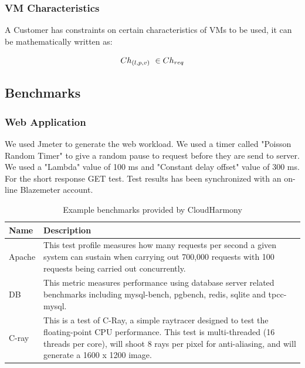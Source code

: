 \subsubsection{VM Characteristics}

A Customer has constraints on certain characteristics of VMs to be used, it can be mathematically written as:
          
\begin{equation} \label{eq:characteristics_constraint}
Ch_{(l,p,v)}\ \in Ch_{req}
\end{equation}



\subsection{Benchmarks}
\subsubsection{Web Application}
We used Jmeter to generate the web workload.
We used a timer called "Poisson Random Timer" to give a random pause to request before they are send to server. We used a "Lambda" value of 100 ms and "Constant delay offset" value of 300 ms. For the short response GET test.
Test results has been synchronized with an on-line Blazemeter account.


\begin{table}[!htbp]
\caption{Example benchmarks provided by CloudHarmony}
\label{table:Example_benchmarks}
\begin{center}
    \begin{tabularx}{\textwidth}{|l|X|}
    \hline
    Name & Description \\ \hline
    Apache & This test profile measures how many requests per second a given system can sustain when carrying out 700,000 requests with 100 requests being carried out concurrently. \\ \hline
    DB & This metric measures performance using database server related benchmarks including mysql-bench, pgbench, redis, sqlite and tpcc-mysql. \\ \hline
    C-ray & This is a test of C-Ray, a simple raytracer designed to test the floating-point CPU performance. This test is multi-threaded (16 threads per core), will shoot 8 rays per pixel for anti-aliasing, and will generate a 1600 x 1200 image. \\ \hline    
    \end{tabularx}
\end{center}
\end{table}

